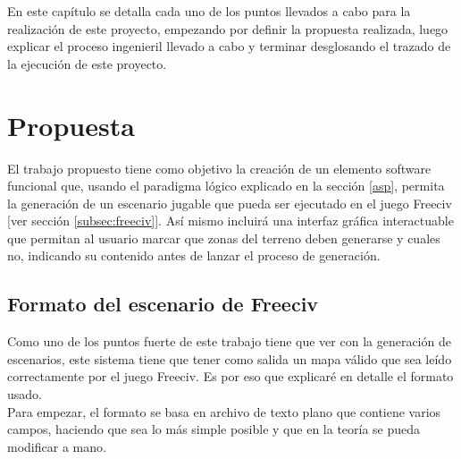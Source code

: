 En este capítulo se detalla cada uno de los puntos llevados a cabo para la realización de este proyecto, empezando por definir la propuesta realizada, luego explicar el proceso ingenieril llevado a cabo y terminar desglosando el trazado de la ejecución de este proyecto.

\section{Propuesta}

El trabajo propuesto tiene como objetivo la creación de un elemento software funcional que, usando el paradigma lógico explicado en la sección \ref{asp}, permita la generación de un escenario jugable que pueda ser ejecutado en el juego Freeciv [ver sección \ref{subsec:freeciv}]. Así mismo incluirá una interfaz gráfica interactuable que permitan al usuario marcar que zonas del terreno deben generarse y cuales no, indicando su contenido antes de lanzar el proceso de generación.

\subsection{Formato del escenario de Freeciv}

Como uno de los puntos fuerte de este trabajo tiene que ver con la generación de escenarios, este sistema tiene que tener como salida un mapa válido que sea leído correctamente por el juego Freeciv. Es por eso que explicaré en detalle el formato usado. \\

Para empezar, el formato se basa en archivo de texto plano que contiene varios campos, haciendo que sea lo más simple posible y que en la teoría se pueda modificar a mano.

